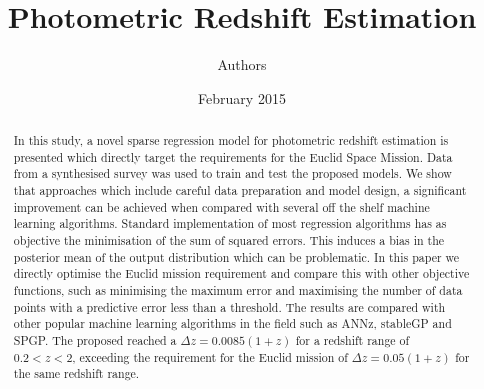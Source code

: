 \documentclass[a4paper,12pt]{article}
\title{Photometric Redshift Estimation}
\author{Authors}
\date{February 2015}
\begin{document}
\maketitle

\begin{abstract}
In this study, a novel sparse regression model for photometric redshift estimation is presented which directly target the requirements for the Euclid Space Mission. Data from a synthesised survey was used to train and test the proposed models. We show that approaches which include careful data preparation and model design, a significant improvement can be achieved when compared with several off the shelf machine learning algorithms. Standard implementation of most regression algorithms has as objective the minimisation of the sum of squared errors. This induces a bias in the posterior mean of the output distribution which can be problematic. In this paper we directly optimise the Euclid mission requirement and compare this with other objective functions, such as minimising the maximum error and maximising the number of data points with a predictive error less than a threshold. The results are compared with other popular machine learning algorithms in the field such as ANNz, stableGP and SPGP. The proposed reached a $\Delta z = 0.0085(1+z)$ for a redshift range of $0.2 < z < 2$, exceeding the requirement for the Euclid mission of $\Delta z = 0.05(1+z)$ for the same redshift range.

\end{abstract}
\end{document}
